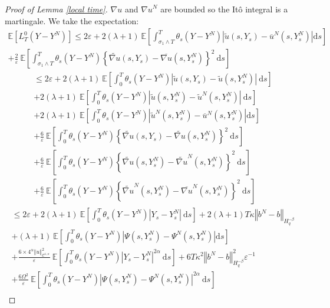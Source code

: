 \documentclass[11pt]{enstaPRE}
\newcommand{\norme}[1]{\left\Vert #1\right\Vert}
\newcommand{\E}{\mathbb{E}}
\newcommand{\di}{\mathrm{d}}
\begin{document}
\begin{proof}[Proof of Lemma \ref{local time}]
    ${\nabla u}$ and ${\nabla u}^N$ are bounded so the Itô integral is a martingale. We take the expectation:
    \begin{multline*}
    \E\left[L^0_T(Y-Y^N)\right] \leq 2\varepsilon + 2(\lambda + 1)\ \E\left[\int_{\sigma_1\wedge T}^T\theta_s\left(Y-Y^N\right)\left|\widetilde{u}\left(s,Y_s\right)-\overline{u}^N\left(s,Y_s^N\right)\right| \di s \right]\\
    +\frac{2}{\varepsilon}\ \E\left[\int_{\sigma_1\wedge T}^T \theta_s\left(Y-Y^N\right)\left\{\widetilde{\nabla u}\left(s,Y_s\right)-{\overline{\nabla u}}\left(s,Y_s^N\right)\right\}^2\ \di s\right]
    \end{multline*}
    \begin{multline*}
    \leq 2\varepsilon + 2(\lambda + 1)\ \E\left[\int_0^T\theta_s\left(Y-Y^N\right)\left|\widetilde{u}\left(s,Y_s\right)-\widetilde{u}\left(s,Y_s^N\right)\right|\ \di s \right]\\+2(\lambda + 1)\ \E\left[\int_0^T\theta_s\left(Y-Y^N\right)\left|\widetilde{u}\left(s,Y_s^N\right)-\widetilde{u}^N\left(s,Y_s^N\right)\right|\ \di s \right]\\+ 2(\lambda + 1)\ \E\left[\int_{0}^T\theta_s\left(Y-Y^N\right)\left|\widetilde{u}^N\left(s,Y_s^N\right)-\overline{u}^N\left(s,Y_s^N\right)\right| \di s \right]\\
    +\frac{6}{\varepsilon}\ \E\left[\int_0^T \theta_s\left(Y-Y^N\right)\left\{\widetilde{\nabla u}\left(s,Y_s\right)-\widetilde{\nabla u}\left(s,Y_s^N\right)\right\}^2\ \di s\right]\\
    +\frac{6}{\varepsilon}\ \E\left[\int_0^T \theta_s\left(Y-Y^N\right)\left\{\widetilde{\nabla u}\left(s,Y_s^N\right)-\widetilde{\nabla u}^N\left(s,Y_s^N\right)\right\}^2\ \di s\right]\\
    +\frac{6}{\varepsilon}\ \E\left[\int_{0}^T \theta_s\left(Y-Y^N\right)\left\{\widetilde{\nabla u}^N\left(s,Y_s^N\right)-{\overline{\nabla u}^N}\left(s,Y_s^N\right)\right\}^2\ \di s\right]
    \end{multline*}
    \begin{multline*}
    \leq 2\varepsilon + 2(\lambda + 1)\ \E\left[\int_0^T\theta_s\left(Y-Y^N\right)\left|Y_s - Y^N_s\right|\ \di s \right] + 2(\lambda + 1)T\kappa\norme{b^N-b}_{H^{-\beta}_{q}} \\
    + (\lambda + 1)\ \E\left[\int_{0}^T\theta_s\left(Y-Y^N\right)\left|\Psi\left(s,Y_s^N\right)-\Psi^N\left(s,Y_s^N\right)\right| \di s \right]\\  
    +\frac{6\times4^{\alpha}\norme{u}_{\mathcal{C}^{1,\alpha}}^2}{\varepsilon}\ \E\left[\int_0^T \theta_s\left(Y-Y^N\right)\left|Y_s - Y^N_s\right|^{2\alpha}\ \di s\right]  + 6T\kappa^2\norme{b^N-b}_{H^{-\beta}_{q}}^2\varepsilon^{-1} \\+\frac{6\Omega^2}{\varepsilon}\ \E\left[\int_{0}^T \theta_s\left(Y-Y^N\right)\left|\Psi\left(s,Y_s^N\right)-{\Psi^N}\left(s,Y_s^N\right)\right|^{2\alpha}\ \di s\right]\\

\end{multline*}
\end{proof}
\end{document}
